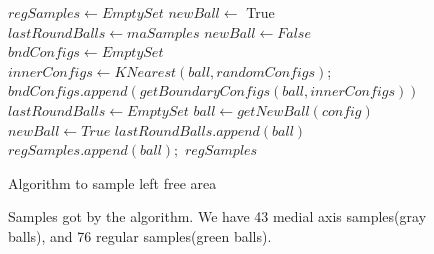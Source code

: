 \documentclass[11pt]{article}
\begin{document}
\begin{figure}
\begin{algorithmic}[1] 
  	\State $regSamples \gets EmptySet$ 
  	\State $newBall \gets$ True	
  	\State $lastRoundBalls \gets maSamples$
  		\State $newBall \gets False$
		\State $bndConfigs \gets EmptySet$   		
  			\State $innerConfigs \gets KNearest(ball, randomConfigs)$; 
  			\State $bndConfigs.append( getBoundaryConfigs(ball, innerConfigs) )$
  		\EndFor
  		\State $lastRoundBalls \gets EmptySet$
  			 
  				\State $ball \gets getNewBall(config)$ 
  					\State $newBall \gets True$
  					\State $lastRoundBalls.append( ball )$
  					\State $regSamples.append(ball);$
  				\EndIf
  			\EndIf
  		\EndFor
  	\EndWhile
  	\State \Return $regSamples$
  \EndFunction
  \end{algorithmic}
  \caption{\label{SampleLeftArea} Algorithm to sample left free area}
\end{figure}

\begin{figure}
	\caption{\label{Samples} Samples got by the algorithm. We have 43 medial axis samples(gray balls), and 76 regular samples(green balls). }
\end{figure}
\end{document}
